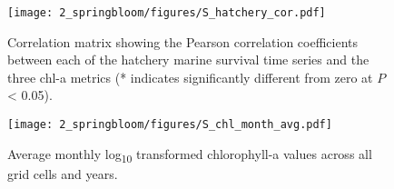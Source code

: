 \begin{figure}[htbp]
  \centering
  \texttt{[image: 2\_springbloom/figures/S\_hatchery\_cor.pdf]}
  \caption[Correlation matrix between each of the hatchery marine survival time
           series and the three chl-a metrics]{Correlation matrix showing the
           Pearson correlation coefficients between each of the hatchery marine
           survival time series and the three chl-a metrics (* indicates
           significantly different from zero at $P$ \textless{} 0.05).}
  \label{fig:bloom:s4}
\end{figure}

\begin{figure}[htbp]
  \centering
  \texttt{[image: 2\_springbloom/figures/S\_chl\_month\_avg.pdf]}
  \caption[Average monthly log\textsubscript{10} transformed chl-a
           values across all grid cells and years]{Average monthly
           log\textsubscript{10} transformed chlorophyll-a values across all
           grid cells and years.}
  \label{fig:bloom:s5}
\end{figure}
